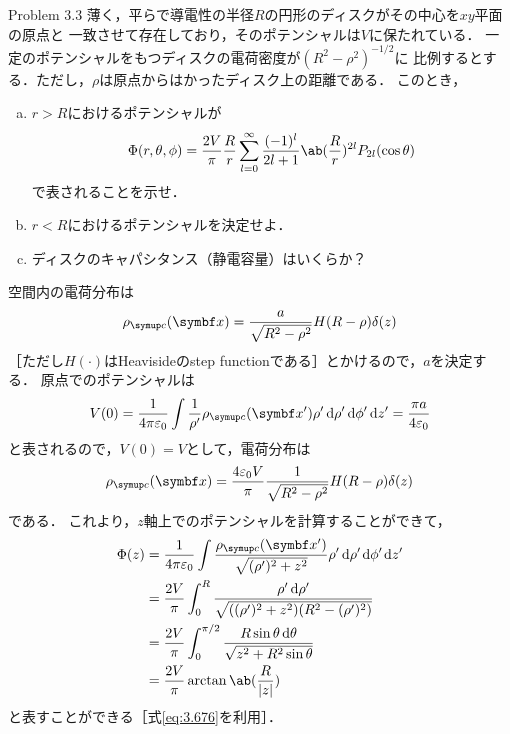   \clearpage
\begin{bx1}{Problem 3.3}
  薄く，平らで導電性の半径$R$の円形のディスクがその中心を$xy$平面の原点と
  一致させて存在しており，そのポテンシャルは$V$に保たれている．
  一定のポテンシャルをもつディスクの電荷密度が$(R^2 - \rho^2)^{-1/2}$に
  比例するとする．ただし，$\rho$は原点からはかったディスク上の距離である．
  このとき，
  \begin{enumerate}[(a)]%
    \item $r > R$におけるポテンシャルが
      \begin{gather}%
        \Phi(r, \theta, \phi) = \frac{2V}{\pi} \frac{R}{r} \sum_{l=0}^\infty \frac{(-1)^l}{2l+1} \ab(\frac R r)^{2l} P_{2l}(\cos\theta)
      \end{gather}%
      で表されることを示せ．
    \item $r < R$におけるポテンシャルを決定せよ．
    \item ディスクのキャパシタンス（静電容量）はいくらか？
  \end{enumerate}%
\end{bx1}
  空間内の電荷分布は
  \begin{gather}%
    \rho_{\mr{c}}(\bs{x}) = \frac{a}{\sqrt{R^2-\rho^2}} H(R-\rho) \delta(z)
  \end{gather}%
  ［ただし$H(\cdot)$はHeavisideのstep functionである］とかけるので，$a$を決定する．
  原点でのポテンシャルは
  \begin{gather}%
    V(0) = \frac{1}{4\pi \eps_0} \int \frac{1}{\rho'}\rho_{\mr{c}}(\bs{x'}) 
    \rho'\dl{\rho'} \dl{\phi'} \dl{z'}
    = \frac{\pi a}{4\eps_0}
  \end{gather}%
  と表されるので，$V(0) = V$として，電荷分布は
  \begin{gather}%
    \rho_{\mr{c}}(\bs{x}) = \frac{4\eps_0 V}{\pi} \frac{1}{\sqrt{R^2 - \rho^2}} 
    H(R-\rho) \delta(z)
  \end{gather}%
  である．
  これより，$z$軸上でのポテンシャルを計算することができて，
  \begin{align}%
    \Phi(z) &= \frac{1}{4\pi \eps_0} \int 
    \frac{\rho_{\mr{c}}(\bs{x'})}{\sqrt{(\rho')^2+z^2}} 
    \rho' \dl{\rho',\phi',z'}\notag\\
    &=\frac{2V}{\pi} \int_0^R \frac{\rho' \dl{\rho'}}
    {\sqrt{
      ((\rho')^2+z^2) (R^2-(\rho')^2)
    }}\notag\\
    &= \frac{2V}{\pi} \int_0^{\pi/2} 
    \frac{R\sin\theta\dl{\theta}}{\sqrt{z^2 + R^2\sin\theta}}\notag\\
    &= \frac{2V}{\pi} \arctan\ab(\frac{R}{|z|})
  \end{align}%
  と表すことができる［式\eqref{eq:3.676}を利用］．

